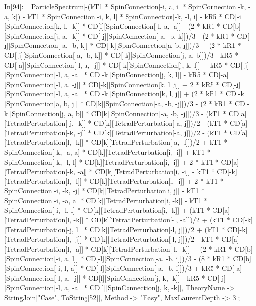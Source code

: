 In[94]:= ParticleSpectrum[-(kT1 * SpinConnection[-i, a, i] * SpinConnection[-k, -a, k]) - kT1 * SpinConnection[-i, k, l] * SpinConnection[-k, -l, i] - kR5 * CD[-i][SpinConnection[k, l, -k]] * CD[i][SpinConnection[-l, a, -a]] - (2 * kR1 * CD[b][SpinConnection[j, a, -k]] * CD[-j][SpinConnection[-a, -b, k]])/3 - (2 * kR1 * CD[-j][SpinConnection[-a, -b, k]] * CD[-k][SpinConnection[a, b, j]])/3 + (2 * kR1 * CD[-j][SpinConnection[-a, -b, k]] * CD[-k][SpinConnection[j, a, b]])/3 - kR5 * CD[-a][SpinConnection[-l, a, -j]] * CD[-k][SpinConnection[j, k, l]] + kR5 * CD[-j][SpinConnection[-l, a, -a]] * CD[-k][SpinConnection[j, k, l]] - kR5 * CD[-a][SpinConnection[-l, a, -j]] * CD[-k][SpinConnection[k, l, j]] + 2 * kR5 * CD[-j][SpinConnection[-l, a, -a]] * CD[-k][SpinConnection[k, l, j]] + (2 * kR1 * CD[-k][SpinConnection[a, b, j]] * CD[k][SpinConnection[-a, -b, -j]])/3 - (2 * kR1 * CD[-k][SpinConnection[j, a, b]] * CD[k][SpinConnection[-a, -b, -j]])/3 - (kT1 * CD[a][TetradPerturbation[-j, -k]] * CD[k][TetradPerturbation[-a, j]])/2 - (kT1 * CD[a][TetradPerturbation[-k, -j]] * CD[k][TetradPerturbation[-a, j]])/2 - (kT1 * CD[a][TetradPerturbation[l, -k]] * CD[k][TetradPerturbation[-a, -l]])/2 + kT1 * SpinConnection[-k, -a, a] * CD[k][TetradPerturbation[i, -i]] + kT1 * SpinConnection[-k, -l, l] * CD[k][TetradPerturbation[i, -i]] + 2 * kT1 * CD[a][TetradPerturbation[-k, -a]] * CD[k][TetradPerturbation[i, -i]] - kT1 * CD[-k][TetradPerturbation[l, -l]] * CD[k][TetradPerturbation[i, -i]] + 2 * kT1 * SpinConnection[-i, -k, -j] * CD[k][TetradPerturbation[i, j]] - kT1 * SpinConnection[-i, -a, a] * CD[k][TetradPerturbation[i, -k]] - kT1 * SpinConnection[-i, -l, l] * CD[k][TetradPerturbation[i, -k]] + (kT1 * CD[a][TetradPerturbation[l, -k]] * CD[k][TetradPerturbation[-l, -a]])/2 + (kT1 * CD[-k][TetradPerturbation[-j, l]] * CD[k][TetradPerturbation[-l, j]])/2 + (kT1 * CD[-k][TetradPerturbation[l, -j]] * CD[k][TetradPerturbation[-l, j]])/2 - kT1 * CD[a][TetradPerturbation[l, -a]] * CD[k][TetradPerturbation[-l, -k]] + (2 * kR1 * CD[b][SpinConnection[-i, a, l]] * CD[-l][SpinConnection[-a, -b, i]])/3 - (8 * kR1 * CD[b][SpinConnection[-i, l, a]] * CD[-l][SpinConnection[-a, -b, i]])/3 + kR5 * CD[-a][SpinConnection[-l, a, -j]] * CD[l][SpinConnection[j, k, -k]] - kR5 * CD[-j][SpinConnection[-l, a, -a]] * CD[l][SpinConnection[j, k, -k]], TheoryName -> StringJoin["Case", ToString[52]], Method -> "Easy", MaxLaurentDepth -> 3]; 